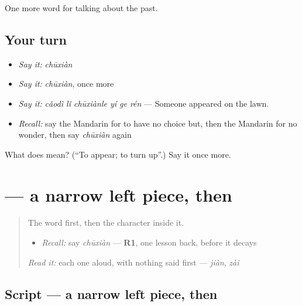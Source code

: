 \begin{grammarlens}[title={What you've built}]
One more word for talking about the past.
\end{grammarlens}

\subsection*{Your turn}
\begin{itemize}
\raggedright
  \item \emph{Say it:} \emph{chūxiàn}
  \item \emph{Say it:} \emph{chūxiàn}, once more
  \item \emph{Say it:} \emph{cǎodì lǐ chūxiànle yí ge rén} — Someone appeared on the lawn.
  \item \emph{Recall:} say the Mandarin for to have no choice but, then the Mandarin for no wonder, then say \emph{chūxiàn} again
\end{itemize}

\begin{tcolorbox}[breakable,colback=teal!4,colframe=teal!35!black,title={Before you move on}]
What does  mean? (\textquotedblleft{}To appear; to turn up\textquotedblright{}.) Say it once more.
\end{tcolorbox}
\section[\texorpdfstring{\zh{现} (xiàn)}{现 (xiàn)}]{ — a narrow left piece, then }

\label{lesson:ZH-W236-xian-appear}



\begin{quote}
The word first, then the character inside it.

\begin{itemize}
\raggedright
  \item \emph{Recall:} say \emph{chūxiàn} — \textbf{R1}, one lesson back, before it decays
\end{itemize}

\begin{quote}
 
\end{quote}

\emph{Read it:} each one aloud, with nothing said first — \emph{jiàn}, \emph{zài}
\end{quote}

\subsection*{Script — a narrow left piece, then }


